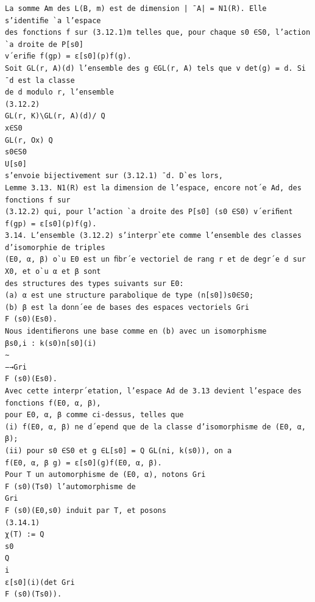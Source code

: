 \documentclass[11pt]{article}
\begin{document}
\begin{Verbatim}[breaklines=true,fontsize=\small]
La somme Am des L(B, m) est de dimension | ¯A| = N1(R). Elle s’identiﬁe `a l’espace
des fonctions f sur (3.12.1)m telles que, pour chaque s0 ∈S0, l’action `a droite de P[s0]
v´eriﬁe f(gp) = ε[s0](p)f(g).
Soit GL(r, A)(d) l’ensemble des g ∈GL(r, A) tels que v det(g) = d. Si ¯d est la classe
de d modulo r, l’ensemble
(3.12.2)
GL(r, K)\GL(r, A)(d)/ Q
x∈S0
GL(r, Ox) Q
s0∈S0
U[s0]
s’envoie bijectivement sur (3.12.1) ¯d. D`es lors,
Lemme 3.13. N1(R) est la dimension de l’espace, encore not´e Ad, des fonctions f sur
(3.12.2) qui, pour l’action `a droite des P[s0] (s0 ∈S0) v´eriﬁent f(gp) = ε[s0](p)f(g).
3.14. L’ensemble (3.12.2) s’interpr`ete comme l’ensemble des classes d’isomorphie de triples
(E0, α, β) o`u E0 est un ﬁbr´e vectoriel de rang r et de degr´e d sur X0, et o`u α et β sont
des structures des types suivants sur E0:
(a) α est une structure parabolique de type (n[s0])s0∈S0;
(b) β est la donn´ee de bases des espaces vectoriels Gri
F (s0)(Es0).
Nous identiﬁerons une base comme en (b) avec un isomorphisme
βs0,i : k(s0)n[s0](i)
∼
−→Gri
F (s0)(Es0).
Avec cette interpr´etation, l’espace Ad de 3.13 devient l’espace des fonctions f(E0, α, β),
pour E0, α, β comme ci-dessus, telles que
(i) f(E0, α, β) ne d´epend que de la classe d’isomorphisme de (E0, α, β);
(ii) pour s0 ∈S0 et g ∈L[s0] = Q GL(ni, k(s0)), on a
f(E0, α, β g) = ε[s0](g)f(E0, α, β).
Pour T un automorphisme de (E0, α), notons Gri
F (s0)(Ts0) l’automorphisme de
Gri
F (s0)(E0,s0) induit par T, et posons
(3.14.1)
χ(T) := Q
s0
Q
i
ε[s0](i)(det Gri
F (s0)(Ts0)).


\end{Verbatim}
\end{document}
